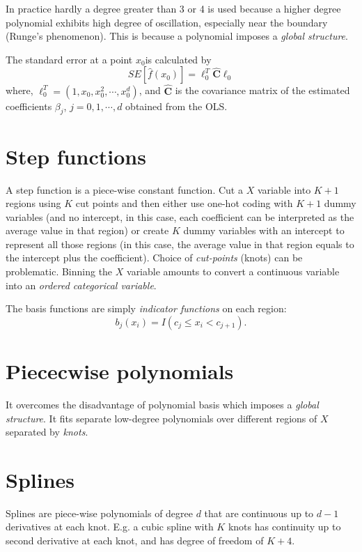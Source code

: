\documentclass[
  letterpaper,
  DIV=11,
  numbers=noendperiod]{scrreprt}
\begin{document}
In practice hardly a degree greater than 3 or 4 is used because a higher
degree polynomial exhibits high degree of oscillation, especially near
the boundary (Runge's phenomenon). This is because a polynomial imposes
a \emph{global structure}.

The standard error at a point \(x_0\)is calculated by \[
SE[\hat{f}(x_0)] = \ell_0^T \hat{\mathbf{C}} {\ell}_0
\] where, \(\ell_0^T =(1, x_0, x_0^2, \cdots, x_0^d)\), and
\(\hat{\mathbf{C}}\) is the covariance matrix of the estimated
coefficients \(\beta_j\), \(j=0, 1, \cdots, d\) obtained from the OLS.

\section{Step functions}\label{step-functions}

A step function is a piece-wise constant function. Cut a \(X\) variable
into \(K+1\) regions using \(K\) cut points and then either use one-hot
coding with \(K+1\) dummy variables (and no intercept, in this case,
each coefficient can be interpreted as the average value in that region)
or create \(K\) dummy variables with an intercept to represent all those
regions (in this case, the average value in that region equals to the
intercept plus the coefficient). Choice of \emph{cut-points} (knots) can
be problematic. Binning the \(X\) variable amounts to convert a
continuous variable into an \emph{ordered categorical variable}.

The basis functions are simply \emph{indicator functions} on each
region: \[
b_j(x_i)= I(c_j\le x_i< c_{j+1}).
\]

\section{Piececwise polynomials}\label{piececwise-polynomials}

It overcomes the disadvantage of polynomial basis which imposes a
\emph{global structure}. It fits separate low-degree polynomials over
different regions of \(X\) separated by \emph{knots}.

\section{Splines}\label{splines}

Splines are piece-wise polynomials of degree \(d\) that are continuous
up to \(d-1\) derivatives at each knot. E.g. a cubic spline with \(K\)
knots has continuity up to second derivative at each knot, and has
degree of freedom of \(K+4\).
\end{document}

